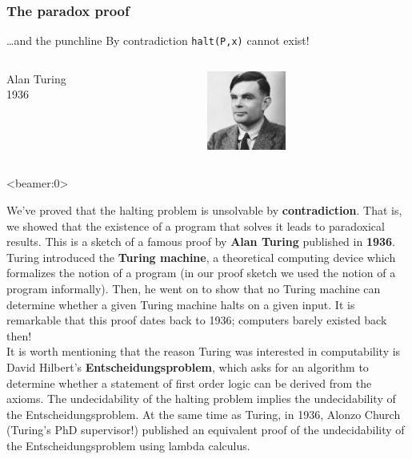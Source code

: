 \documentclass[handout, 12pt]{beamer}
\begin{document}
\begin{frame}

\frametitle{The paradox proof}

\begin{block}{\ldots and the punchline}
\centering
\vspace{1.5em}
{\large By contradiction \texttt{halt(P,x)} cannot exist!}
\end{block}

\begin{block}{}
\centering
\color{r}{\large QED}
\end{block}

\pause

\begin{block}{}
\begin{columns}[c] 
\begin{column}{0.5\textwidth}
\raggedleft
Alan Turing\\
1936
\end{column}
\begin{column}{0.6\textwidth}
\raggedright
\includegraphics[width=7em]{pics/alan_turing.jpg}
\end{column}
\end{columns}
\end{block}

\end{frame}

\begin{frame}<beamer:0>

\footnotesize
We've proved that the halting problem is unsolvable by \textbf{contradiction}. That is, we showed that the existence of a program that solves it leads to paradoxical results. This is a sketch of a famous proof by \textbf{Alan Turing} published in \textbf{1936}. Turing introduced the \textbf{Turing machine}, a theoretical computing device which formalizes the notion of a program (in our proof sketch we used the notion of a program informally). Then, he went on to show that no Turing machine can determine whether a given Turing machine halts on a given input. It is remarkable that this proof dates back to 1936; computers barely existed back then!
\\[0.6em]
It is worth mentioning that the reason Turing was interested in computability is David Hilbert's \textbf{Entscheidungsproblem}, which asks for an algorithm to determine whether a statement of first order logic can be derived from the axioms. The undecidability of the halting problem implies the undecidability of the Entscheidungsproblem. At the same time as Turing, in 1936, Alonzo Church (Turing's PhD supervisor!) published an equivalent proof of the undecidability of the Entscheidungsproblem using lambda calculus.

\end{frame}
\end{document}
